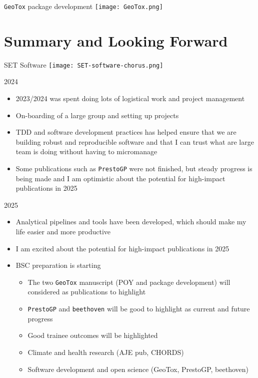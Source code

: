 \documentclass[
  ignorenonframetext,
]{beamer}
\providecommand{\tightlist}{%
  \setlength{\itemsep}{0pt}\setlength{\parskip}{0pt}}\usepackage{longtable,booktabs,array}
\begin{document}
\begin{frame}{\texttt{GeoTox} package development}
\label{geotox-package-development-1}
\texttt{[image: GeoTox.png]}
\end{frame}

\section{Summary and Looking Forward}\label{summary-and-looking-forward}

\begin{frame}{SET Software}
\label{set-software}
\texttt{[image: SET-software-chorus.png]}
\end{frame}

\begin{frame}[fragile]{2024}
\label{section}
\begin{itemize}
\tightlist
\item
  2023/2024 was spent doing lots of logistical work and project
  management
\item
  On-boarding of a large group and setting up projects
\item
  TDD and software development practices has helped ensure that we are
  building robust and reproducible software and that I can trust what
  are large team is doing without having to micromanage
\item
  Some publications such as \texttt{PrestoGP} were not finished, but
  steady progress is being made and I am optimistic about the potential
  for high-impact publications in 2025
\end{itemize}
\end{frame}

\begin{frame}[fragile]{2025}
\label{section-1}
\begin{itemize}
\tightlist
\item
  Analytical pipelines and tools have been developed, which should make
  my life easier and more productive
\item
  I am excited about the potential for high-impact publications in 2025
\item
  BSC preparation is starting

  \begin{itemize}
  \tightlist
  \item
    The two \texttt{GeoTox} manuscript (POY and package development)
    will considered as publications to highlight
  \item
    \texttt{PrestoGP} and \texttt{beethoven} will be good to highlight
    as current and future progress
  \item
    Good trainee outcomes will be highlighted
  \item
    Climate and health research (AJE pub, CHORDS)
  \item
    Software development and open science (GeoTox, PrestoGP, beethoven)
  \end{itemize}
\end{itemize}
\end{frame}
\end{document}
